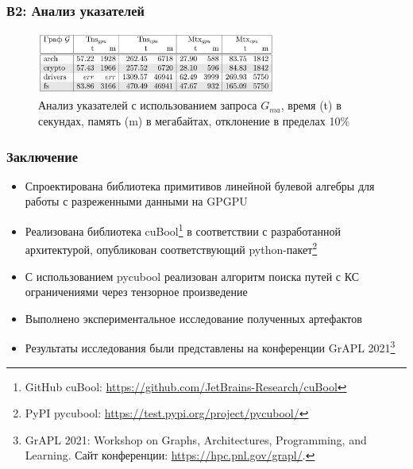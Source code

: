 \documentclass[aspectratio=169,xcolor=table,english]{beamer}
\begin{document}
\begin{frame}[fragile] \frametitle{В2: Анализ указателей}
    \begin{center}
     \begin{minipage}[m]{0.9\linewidth}
        \begin{figure}
            \centering
            \includegraphics[width=0.7\textwidth]{figures/results_3_rq2.png}
            \caption{Анализ указателей с использованием запроса $G_{ma}$, время (t) в секундах, память (m) в мегабайтах, отклонение в пределах 10\%}
        \end{figure}
    \end{minipage}\hfill   
    \end{center}
\end{frame}

\begin{frame}[fragile] \frametitle{Заключение}
    \begin{itemize}
        \item Спроектирована библиотека примитивов линейной булевой алгебры для работы с разреженными данными на GPGPU
        \item Реализована библиотека cuBool\footnote{GitHub cuBool: \url{https://github.com/JetBrains-Research/cuBool}} в соответствии с разработанной архитектурой, опубликован соответствующий python-пакет\footnote{PyPI pycubool: \url{https://test.pypi.org/project/pycubool/}} 
        \item С использованием pycubool реализован алгоритм поиска путей с КС ограничениями через тензорное произведение
        \item Выполнено экспериментальное исследование полученных артефактов
        \break
        \item  Результаты исследования были представлены на конференции GrAPL 2021\footnote{GrAPL 2021: Workshop on Graphs, Architectures, Programming, and Learning. Сайт конференции: \url{https://hpc.pnl.gov/grapl/}.}
    \end{itemize}
\end{frame}
\end{document}
